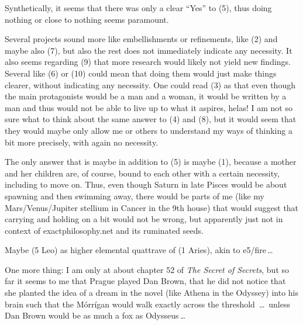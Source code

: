 \noindent
Synthetically,
it seems that there was only a {\color{xphi}clear “Yes” to (5),
thus doing nothing or close to nothing seems paramount}.

Several projects sound more like embellishments or refinements,
like (2) and maybe also (7),
but also the rest does not immediately indicate any necessity.
%
It also seems regarding (9)
that more research would likely not yield new findings.
%
Several like (6) or (10)
could mean that doing them would just make things clearer,
without indicating any necessity.
%
One could read (3)
as that even though the main protagonists would be a man and a woman,
it would be written by a man
and thus would not be able to live up to what it aspires,
helas!
%
I am not so sure what to think about the same answer to (4) and (8),
but it would seem
that they would maybe only allow me or others
to understand my ways of thinking a bit more precisely,
with again no necessity.

{\color{xphi}The only answer that is maybe in addition to (5) is maybe (1)},
because a mother and her children are,
of course,
bound to each other with a certain necessity,
including to move on.
%
Thus,
even though Saturn in late Pisces
would be about spawning and then swimming away,
there would be parts of me
(like my Mars/Venus/Jupiter stellium in Cancer in the 9th house)
that would suggest
that carrying and holding on a bit
would not be wrong,
but apparently just not in context of exactphilosophy.net
and its ruminated seeds.

Maybe (5 Leo) as higher elemental quattrave of (1 Aries),
{\color{xphi}akin to e5/fire}\,…

\vspace{2.2mm}
\noindent
{\footnotesize%
{\color{xphi}One more thing:}
I am only at about chapter 52 of \textsl{The Secret of Secrets},
but so far it seems to me that Prague played Dan Brown,
that he did not notice
that she planted the idea of a dream in the novel
(like Athena in the Odyssey)
into his brain
such that the Mórrígan would walk exactly across the threshold\
…\ unless Dan Brown would be as much a fox as Odysseus\,…%
\par}


